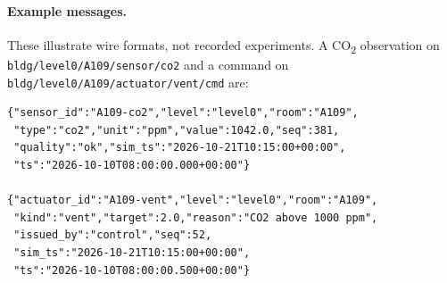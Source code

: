 \documentclass[11pt,a4paper]{article}
\begin{document}
\paragraph{Example messages.}
These illustrate wire formats, not recorded experiments. A CO\textsubscript{2} observation on \texttt{bldg/level0/A109/sensor/co2} and a command on \texttt{bldg/level0/A109/actuator/vent/cmd} are:
{\small\begin{verbatim}
{"sensor_id":"A109-co2","level":"level0","room":"A109",
 "type":"co2","unit":"ppm","value":1042.0,"seq":381,
 "quality":"ok","sim_ts":"2026-10-21T10:15:00+00:00",
 "ts":"2026-10-10T08:00:00.000+00:00"}

{"actuator_id":"A109-vent","level":"level0","room":"A109",
 "kind":"vent","target":2.0,"reason":"CO2 above 1000 ppm",
 "issued_by":"control","seq":52,
 "sim_ts":"2026-10-21T10:15:00+00:00",
 "ts":"2026-10-10T08:00:00.500+00:00"}
\end{verbatim}}
\end{document}
